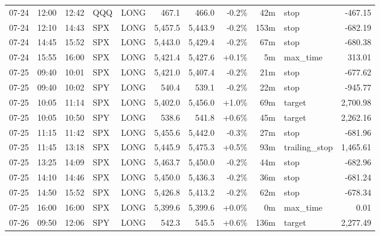 \documentclass[11pt,a4paper,twoside]{article}
\begin{document}
\begin{center}
\begin{longtable}{>{\color{txtmain}}l l l l l r r r r >{\color{txtmain}}l r}
07-24 & 12:00 & 12:42 & QQQ & LONG & 467.1 & 466.0 & \textcolor{lossred}{-0.2\%} & 42m & stop & \textcolor{lossred}{-467.15} \\
07-24 & 12:10 & 14:43 & SPX & LONG & 5,457.5 & 5,443.9 & \textcolor{lossred}{-0.2\%} & 153m & stop & \textcolor{lossred}{-682.19} \\
07-24 & 14:45 & 15:52 & SPX & LONG & 5,443.0 & 5,429.4 & \textcolor{lossred}{-0.2\%} & 67m & stop & \textcolor{lossred}{-680.38} \\
07-24 & 15:55 & 16:00 & SPX & LONG & 5,421.4 & 5,427.6 & \textcolor{wingreen}{+0.1\%} & 5m & max\_time & \textcolor{wingreen}{313.01} \\
07-25 & 09:40 & 10:01 & SPX & LONG & 5,421.0 & 5,407.4 & \textcolor{lossred}{-0.2\%} & 21m & stop & \textcolor{lossred}{-677.62} \\
07-25 & 09:40 & 10:02 & SPY & LONG & 540.4 & 539.1 & \textcolor{lossred}{-0.2\%} & 22m & stop & \textcolor{lossred}{-945.77} \\
07-25 & 10:05 & 11:14 & SPX & LONG & 5,402.0 & 5,456.0 & \textcolor{wingreen}{+1.0\%} & 69m & target & \textcolor{wingreen}{2,700.98} \\
07-25 & 10:05 & 10:50 & SPY & LONG & 538.6 & 541.8 & \textcolor{wingreen}{+0.6\%} & 45m & target & \textcolor{wingreen}{2,262.16} \\
07-25 & 11:15 & 11:42 & SPX & LONG & 5,455.6 & 5,442.0 & \textcolor{lossred}{-0.3\%} & 27m & stop & \textcolor{lossred}{-681.96} \\
07-25 & 11:45 & 13:18 & SPX & LONG & 5,445.9 & 5,475.3 & \textcolor{wingreen}{+0.5\%} & 93m & trailing\_stop & \textcolor{wingreen}{1,465.61} \\
07-25 & 13:25 & 14:09 & SPX & LONG & 5,463.7 & 5,450.0 & \textcolor{lossred}{-0.2\%} & 44m & stop & \textcolor{lossred}{-682.96} \\
07-25 & 14:10 & 14:46 & SPX & LONG & 5,450.0 & 5,436.3 & \textcolor{lossred}{-0.2\%} & 36m & stop & \textcolor{lossred}{-681.24} \\
07-25 & 14:50 & 15:52 & SPX & LONG & 5,426.8 & 5,413.2 & \textcolor{lossred}{-0.2\%} & 62m & stop & \textcolor{lossred}{-678.34} \\
07-25 & 16:00 & 16:00 & SPX & LONG & 5,399.6 & 5,399.6 & \textcolor{wingreen}{+0.0\%} & 0m & max\_time & \textcolor{wingreen}{0.01} \\
07-26 & 09:50 & 12:06 & SPY & LONG & 542.3 & 545.5 & \textcolor{wingreen}{+0.6\%} & 136m & target & \textcolor{wingreen}{2,277.49} \\

\end{longtable}
\end{center}
\end{document}
